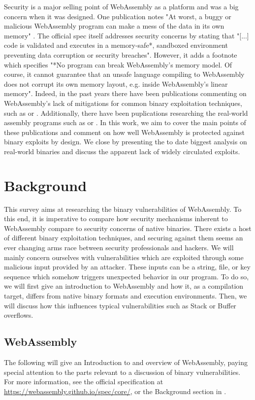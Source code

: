 \documentclass[sigconf]{acmart}
\begin{document}
Security is a major selling point of WebAssembly as a platform and was a big concern when it was designed. One publication notes "At worst, a buggy or malicious WebAssembly program can make a mess of the data in its own memory" \cite{rossberg_bringing_2018}. The official spec itself addresses security concerns by stating that "[...] code is validated and executes in a memory-safe*, sandboxed environment preventing data corruption or security breaches". However, it adds a footnote which specifies "*No program can break WebAssembly’s memory model. Of course, it cannot guarantee that an unsafe language compiling to WebAssembly does not corrupt its own memory layout, e.g. inside WebAssembly’s linear memory". Indeed, in the past years there have been publications commenting on WebAssembly's lack of mitigations for common binary exploitation techniques, such as \citet{mcfadden_security_2018} or \citet{lehmann_everything_2020}. Additionally, there have been puplications researching the real-world assembly programs such as \citet{musch_new_2019} or \citet{hilbig_empirical_2021}. In this work, we aim to cover the main points of these publications and comment on how well WebAssembly is protected against binary exploits by design. We close by presenting the to date biggest analysis on real-world binaries and discuss the apparent lack of widely circulated exploits.

\section{Background}
\label{sec:background}
This survey aims at researching the binary vulnerabilities of WebAssembly. To this end, it is imperative to compare how security mechanisms inherent to WebAssembly compare to security concerns of native binaries. There exists a host of different binary exploitation techniques, and securing against them seems an ever changing arms race between security professionals and hackers. We will mainly concern ourselves with vulnerabilities which are exploited through some malicious input provided by an attacker. These inputs can be a string, file, or key sequence which somehow triggers unexpected behavior in our program. To do so, we will first give an introduction to WebAssembly and how it, as a compilation target, differs from native binary formats and execution environments. Then, we will discuss how this influences typical vulnerabilities such as Stack or Buffer overflows. 

\subsection{WebAssembly}
\label{sec:wasm}
The following will give an Introduction to and overview of WebAssembly, paying special attention to the parts relevant to a discussion of binary vulnerabilities. For more information, see the official specification at \url{https://webassembly.github.io/spec/core/}, or the Background section in \citet{lehmann_everything_2020}. 
\end{document}
